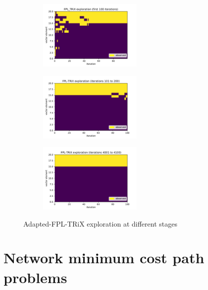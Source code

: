\begin{figure}[ht!]
\centering
\begin{subfigure}{.33\textwidth}
  \centering
  \includegraphics[width=50mm]{../plots/basicFPL_100iters.pdf}
\end{subfigure}%
\begin{subfigure}{.33\textwidth}
  \centering
  \includegraphics[width=50mm]{../plots/basicFPL_100_200iters.pdf}
\end{subfigure}
\begin{subfigure}{.33\textwidth}
  \centering
  \includegraphics[width=50mm]{../plots/basicFPL_4000_4100iters.pdf}
\end{subfigure}
\caption{Adapted-FPL-TRiX exploration at different stages}
\label{fig:fpltrix_basic}
\end{figure}


\pagebreak


\section{Network minimum cost path problems}

